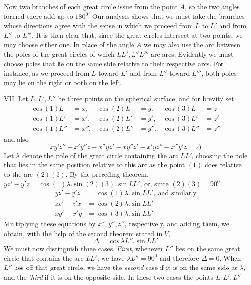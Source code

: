 %
\noindent Now two branches of each great circle issue from the point \(A\), so the two angles formed there add up to \(180^0\). Our analysis shows that we must take the branches whose directions agree with the sense in which we proceed from \(L\) to \(L'\) and from \(L''\) to \(L'''\). It is then clear that, since the great circles intersect at two points, we may choose either one. In place of the angle \(A\) we may also use the arc between the poles of the great circles of which \(LL',L''L'''\) are arcs. Evidently we must choose poles that lie on the same side relative to their respective arcs. For instance, as we proceed from \(L\) toward \(L'\) and from \(L''\) toward \(L'''\), both poles may lie on the right or both on the left.

VII. Let \(L,L',L''\) be three points on the spherical surface, and for brevity set
\[
\begin{aligned}
\cos(1)L&=x,&\cos(2)L&=y,&\cos(3)L&=z\\
\cos(1)L'&=x',&\cos(2)L'&=y',&\cos(3)L'&=z'\\
\cos(1)L''&=x'',&\cos(2)L''&=y'',&\cos(3)L''&=z''
\end{aligned}
\]
\noindent and also
\[
xy'z''+x'y''z+x''yz'-xy''z'-x'yz''-x''y'z=\Delta
\]
\noindent Let \(\lambda\) denote the pole of the great circle containing the arc \(LL'\), choosing the pole that lies in the same position relative to this arc as the point \((1)\) does relative to the arc \((2)(3)\). By the preceding theorem, \(yz'-y'z=\cos(1)\lambda\mathord{.}\sin(2)(3)\mathord{.}\sin LL'\), or, since \((2)(3)=90^0\),
\[
\begin{aligned}
yz'-y'z&=\cos(1)\lambda\mathord{.}\sin LL',\ \text{and similarly}\\
zx'-z'x&=\cos(2)\lambda\mathord{.}\sin LL'\\
xy'-x'y&=\cos(3)\lambda\mathord{.}\sin LL'
\end{aligned}
\]
\noindent Multiplying these equations by \(x'',y'',z''\), respectively, and adding them, we obtain, with the help of the second theorem stated in \(V\),
\[
\Delta=\cos\lambda L''\mathord{.}\sin LL'
\]
\noindent We must now distinguish three cases. \textit{First}, whenever \(L''\) lies on the same great circle that contains the arc \(LL'\), we have \(\lambda L''=90^0\) and therefore \(\Delta=0\). When \(L''\) lies off that great circle, we have the \textit{second} case if it is on the same side as \(\lambda\), and the \textit{third} if it is on the opposite side. In these two cases the points \(L,L',L''\)
